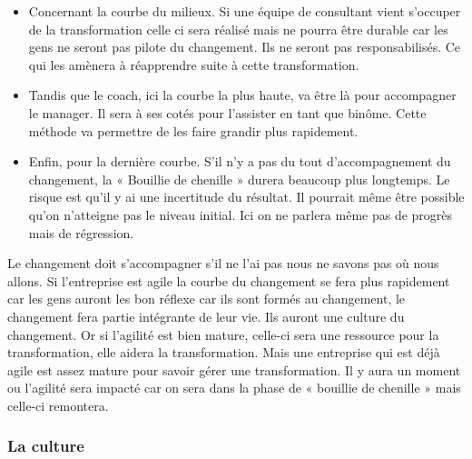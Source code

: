 \documentclass[12pt,a4paper]{article}
\begin{document}
\begin{itemize}
\item Concernant la courbe du milieux. Si une équipe de consultant vient s'occuper de la transformation celle ci sera réalisé mais ne pourra être durable car les gens ne seront pas pilote du changement. Ils ne seront pas responsabilisés. Ce qui les amènera à réapprendre suite à cette transformation.\\
\item Tandis que le coach, ici la courbe la plus haute, va être là pour accompagner le manager. Il sera à ses cotés pour l'assister en tant que binôme. Cette méthode va permettre de les faire grandir plus rapidement.\\
\item Enfin, pour la dernière courbe. S'il n'y a pas du tout d'accompagnement du changement, la « Bouillie de chenille » durera beaucoup plus longtemps. Le risque est qu'il y ai une incertitude du résultat. Il pourrait même être possible qu'on n'atteigne pas le niveau initial. Ici on ne parlera même pas de progrès mais de régression.\\
\end{itemize}

Le changement doit s'accompagner s'il ne l'ai pas nous ne savons pas où nous allons. Si l'entreprise est agile la courbe du changement se fera plus rapidement car les gens auront les bon réflexe car ils sont formés au changement, le changement fera partie intégrante de leur vie. Ils auront une culture du changement. Or si l'agilité est bien mature, celle-ci sera une ressource pour la transformation, elle aidera la transformation. Mais une entreprise qui est déjà agile est assez mature pour savoir gérer une transformation. Il y aura un moment ou l'agilité sera impacté car on sera dans la phase de « bouillie de chenille » mais celle-ci remontera. 

\subsubsection{La culture}
\end{document}
